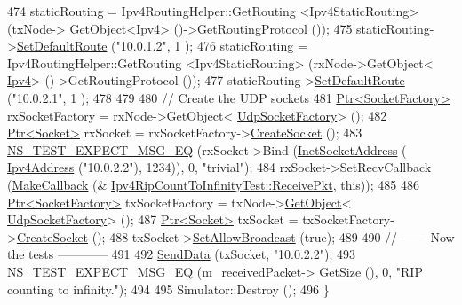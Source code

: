 \begin{DoxyCode}
474   staticRouting = Ipv4RoutingHelper::GetRouting <Ipv4StaticRouting> (txNode->
      \hyperlink{classns3_1_1Object_a13e18c00017096c8381eb651d5bd0783}{GetObject}<\hyperlink{classns3_1_1Ipv4}{Ipv4}> ()->GetRoutingProtocol ());
475   staticRouting->\hyperlink{classns3_1_1Ipv4StaticRouting_aee30fa3246c2b42f122dabdff2725331}{SetDefaultRoute} (\textcolor{stringliteral}{"10.0.1.2"}, 1 );
476   staticRouting = Ipv4RoutingHelper::GetRouting <Ipv4StaticRouting> (rxNode->GetObject<
      \hyperlink{classns3_1_1Ipv4}{Ipv4}> ()->GetRoutingProtocol ());
477   staticRouting->\hyperlink{classns3_1_1Ipv4StaticRouting_aee30fa3246c2b42f122dabdff2725331}{SetDefaultRoute} (\textcolor{stringliteral}{"10.0.2.1"}, 1 );
478 
479 
480   \textcolor{comment}{// Create the UDP sockets}
481   \hyperlink{classns3_1_1Ptr}{Ptr<SocketFactory>} rxSocketFactory = rxNode->GetObject<
      \hyperlink{classns3_1_1UdpSocketFactory}{UdpSocketFactory}> ();
482   \hyperlink{classns3_1_1Ptr}{Ptr<Socket>} rxSocket = rxSocketFactory->\hyperlink{classns3_1_1SocketFactory_a97351e6e7860503a4912042530449f62}{CreateSocket} ();
483   \hyperlink{group__testing_ga7304ba46a28d8cf08dfdfd6499cf7068}{NS\_TEST\_EXPECT\_MSG\_EQ} (rxSocket->Bind (\hyperlink{classns3_1_1InetSocketAddress}{InetSocketAddress} (
      \hyperlink{classns3_1_1Ipv4Address}{Ipv4Address} (\textcolor{stringliteral}{"10.0.2.2"}), 1234)), 0, \textcolor{stringliteral}{"trivial"});
484   rxSocket->SetRecvCallback (\hyperlink{group__makecallbackmemptr_ga9376283685aa99d204048d6a4b7610a4}{MakeCallback} (&
      \hyperlink{classIpv4RipCountToInfinityTest_a34fe6a878c2a4b2151cb2007e761dc2e}{Ipv4RipCountToInfinityTest::ReceivePkt}, \textcolor{keyword}{this}));
485 
486   \hyperlink{classns3_1_1Ptr}{Ptr<SocketFactory>} txSocketFactory = txNode->\hyperlink{classns3_1_1Object_a13e18c00017096c8381eb651d5bd0783}{GetObject}<
      \hyperlink{classns3_1_1UdpSocketFactory}{UdpSocketFactory}> ();
487   \hyperlink{classns3_1_1Ptr}{Ptr<Socket>} txSocket = txSocketFactory->\hyperlink{classns3_1_1SocketFactory_a97351e6e7860503a4912042530449f62}{CreateSocket} ();
488   txSocket->\hyperlink{classns3_1_1Socket_a32b4fa27b732a63207c8d9054a817ed5}{SetAllowBroadcast} (\textcolor{keyword}{true});
489 
490   \textcolor{comment}{// ------ Now the tests ------------}
491 
492   \hyperlink{classIpv4RipCountToInfinityTest_ab4507d1a122b2329377d410c5678ffa6}{SendData} (txSocket, \textcolor{stringliteral}{"10.0.2.2"});
493   \hyperlink{group__testing_ga7304ba46a28d8cf08dfdfd6499cf7068}{NS\_TEST\_EXPECT\_MSG\_EQ} (\hyperlink{classIpv4RipCountToInfinityTest_ac2a357fe9b26ee36a808472b7cb063a7}{m\_receivedPacket}->
      \hyperlink{classns3_1_1Packet_a462855c9929954d4301a4edfe55f4f1c}{GetSize} (), 0, \textcolor{stringliteral}{"RIP counting to infinity."});
494 
495   Simulator::Destroy ();
496 \}
\end{DoxyCode}


